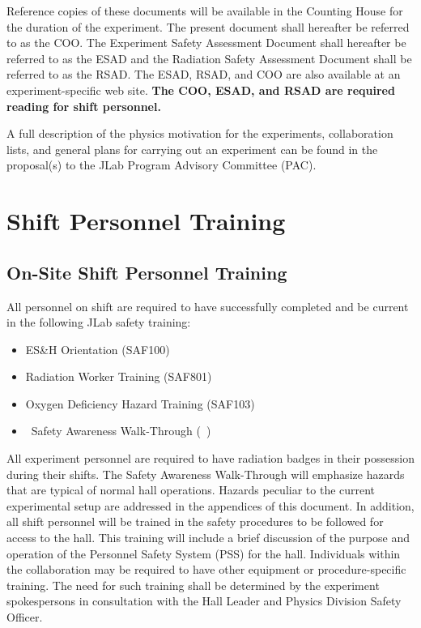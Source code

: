 \documentclass[11pt]{article}
\begin{document}

Reference copies of these documents will be available in the Counting 
House for the duration of the experiment. The present document shall 
hereafter be referred to as the COO. The Experiment Safety Assessment 
Document shall hereafter be referred to as the ESAD and the
Radiation Safety Assessment Document shall be referred to as the RSAD.
The ESAD, RSAD, and COO are also available at an experiment-specific 
web site. {\bf The COO, ESAD, and RSAD are required reading for 
shift personnel.}

A full description of the physics motivation for the experiments, collaboration 
lists, and general plans for carrying out an experiment can be found in the
proposal(s) to the JLab Program Advisory Committee (PAC). 

\section{Shift Personnel Training}
\indent
\subsection{On-Site Shift Personnel Training}

All personnel on shift are required to have successfully completed and be 
current in the following JLab safety training:

\begin{itemize}

\item ES\&H Orientation (SAF100) 

\item Radiation Worker Training (SAF801) 

\item Oxygen Deficiency Hazard Training (SAF103) 

\item \HALL\ Safety Awareness Walk-Through (\AWARENESS\ $\!\!$)

\end{itemize}

 All experiment personnel are 
required to have radiation badges in their possession during their shifts. 
The Safety Awareness Walk-Through will
emphasize hazards that are typical of normal hall operations.
Hazards  peculiar to the current experimental setup are addressed in the appendices 
of this document. 
In addition, all shift personnel will be trained in the safety procedures to be
followed for access to the hall. This
training will include a brief discussion of the purpose and operation of the
Personnel Safety System (PSS) for the hall. 
Individuals within the collaboration may be required to have other equipment 
or procedure-specific training. The need for such
training shall be determined by the experiment spokespersons in consultation 
with the Hall Leader and Physics Division Safety Officer.
\end{document}
